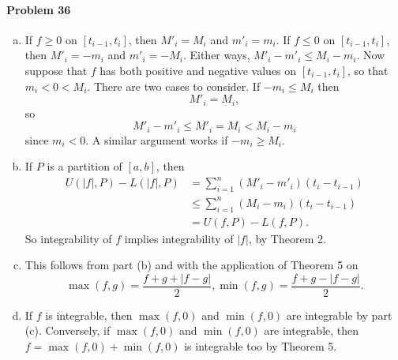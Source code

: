 \documentclass{article}
\begin{document}
\paragraph{Problem 36}
\begin{enumerate}[(a)]
  \item If $f \geq 0$ on $[t_{i-1}, t_i]$, then $M'_i = M_i$ and $m'_i = m_i$.
    If $f \leq 0$ on $[t_{i-1}, t_i]$, then $M'_i = -m_i$ and $m'_i = -M_i$.
    Either ways, $M'_i - m'_i \leq M_i - m_i$. Now suppose that $f$ has both
    positive and negative values on $[t_{i-1}, t_i]$, so that $m_i < 0 < M_i$.
    There are two cases to consider. If $-m_i \leq M_i$ then \[
      M'_i = M_i,
    \] so \[
      M'_i - m'_i \leq M'_i = M_i < M_i - m_i
    \] since $m_i < 0$. A similar argument works if $-m_i \geq M_i$.
  \item If $P$ is a partition of $[a, b]$, then
    \begin{align*}
      U(|f|, P) - L(|f|, P)
      &= \sum_{i=1}^n (M'_i - m'_i)(t_i - t_{i-1}) \\
      &\leq \sum_{i=1}^n (M_i - m_i)(t_i - t_{i-1}) \\
      &= U(f, P) - L(f, P).
    \end{align*} So integrability of $f$ implies integrability of $|f|$, by
    Theorem 2.
  \item This follows from part (b) and with the application of Theorem 5 on \[
      \max(f, g) = \frac{f + g + |f - g|}{2},
      \min(f, g) = \frac{f + g - |f - g|}{2}.
    \]
  \item If $f$ is integrable, then $\max(f, 0)$ and $\min(f, 0)$ are integrable
    by part (c). Conversely, if $\max(f, 0)$ and $\min(f, 0)$ are integrable,
    then $f = \max(f, 0) + \min(f, 0)$ is integrable too by Theorem 5.
\end{enumerate}
\end{document}
